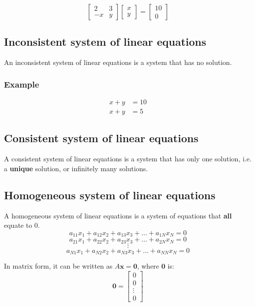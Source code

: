 \documentclass[11pt]{article}
\begin{document}
\begin{displaymath}
\begin{bmatrix}
2 & 3 \\
-x & y
\end{bmatrix} \begin{bmatrix}
x \\
y
\end{bmatrix} = \begin{bmatrix}
10 \\
0
\end{bmatrix}
\end{displaymath}

\subsection{Inconsistent system of linear equations}
\label{sec:org03c4bc7}
An inconsistent system of linear equations is a system that has no solution.

\subsubsection{Example}
\label{sec:orgc6445c9}
\begin{align*}
x + y &= 10 \\
x + y &= 5
\end{align*}

\subsection{Consistent system of linear equations}
\label{sec:orgcbb6562}
A consistent system of linear equations is a system that has only one solution, i.e. a \textbf{unique} solution, or infinitely many solutions.

 \newpage

\subsection{Homogeneous system of linear equations}
\label{sec:org95c987d}
A homogeneous system of linear equations is a system of equations that \textbf{all} equate to 0.
\[a_{11}x_1 + a_{12}x_2 + a_{13}x_3 + \ldots + a_{1N}x_{N} = 0\]
\[a_{21}x_1 + a_{22}x_2 + a_{23}x_3 + \ldots + a_{2N}x_{N} = 0\]
\[\vdots\]
\[a_{N1}x_1 + a_{N2}x_2 + a_{N3}x_3 + \ldots + a_{NN}x_{N} = 0\]

In matrix form, it can be written as \(A \boldsymbol{x} = \boldsymbol{0}\), where \(\boldsymbol{0}\) is:
\begin{displaymath}
\boldsymbol{0} = \begin{bmatrix}
0 \\
0 \\
\vdots \\
0
\end{bmatrix}
\end{displaymath}
\end{document}
